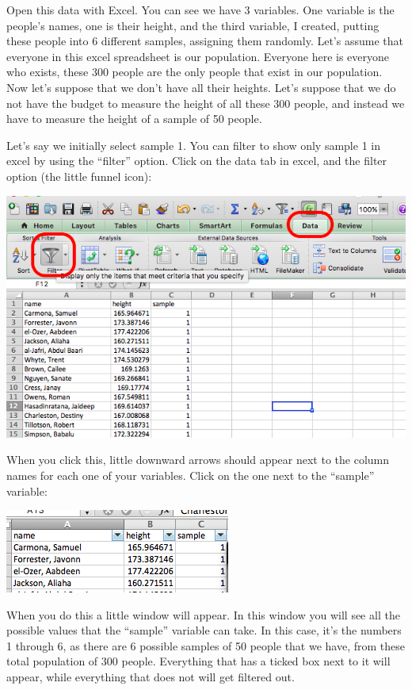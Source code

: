 \documentclass[]{book}
\theoremstyle{definition}
\theoremstyle{definition}
\theoremstyle{definition}
\theoremstyle{remark}
\begin{document}
Open this data with Excel. You can see we have 3 variables. One variable
is the people's names, one is their height, and the third variable, I
created, putting these people into 6 different samples, assigning them
randomly. Let's assume that everyone in this excel spreadsheet is our
population. Everyone here is everyone who exists, these 300 people are
the only people that exist in our population. Now let's suppose that we
don't have all their heights. Let's suppose that we do not have the
budget to measure the height of all these 300 people, and instead we
have to measure the height of a sample of 50 people.

Let's say we initially select sample 1. You can filter to show only
sample 1 in excel by using the ``filter'' option. Click on the data tab
in excel, and the filter option (the little funnel icon):

\includegraphics{imgs/filter_data.png}

When you click this, little downward arrows should appear next to the
column names for each one of your variables. Click on the one next to
the ``sample'' variable:

\includegraphics{imgs/filter_arrows.png}

When you do this a little window will appear. In this window you will
see all the possible values that the ``sample'' variable can take. In
this case, it's the numbers 1 through 6, as there are 6 possible samples
of 50 people that we have, from these total population of 300 people.
Everything that has a ticked box next to it will appear, while
everything that does not will get filtered out.
\end{document}
